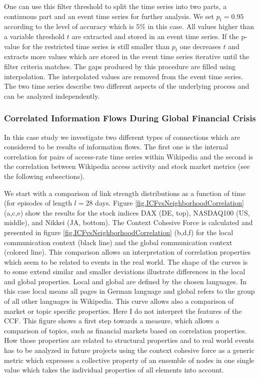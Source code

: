 \documentclass[a4paper,10pt]{scrbook}
\begin{document}
One can use this filter threshold to split the time series into two parts, a continuous part and an event time series for further analysis. We set $p_t = 0.95$ according to the level of accuracy which is $5\%$ in this case. All values higher than a variable threshold $t$ are extracted and stored in an event time series. If the p-value for the restricted time series is still smaller than $p_t$ one decreases $t$ and extracts more values which are stored in the event time series iterative until the filter criteria matches. The gaps produced by this procedure are filled using interpolation. The interpolated values are removed from the event time series. The two time series describe two different aspects of the underlying process and can be analyzed independently.

\subsubsection{Correlated Information Flows During Global Financial Crisis}
In this case study we investigate two different types of connections which are considered to be results of information flows. The first one is the internal correlation for pairs of access-rate time series within Wikipedia and the second is the correlation between Wikipedia access activity and stock market metrics (see the following subsections). 
%
\label{ext.fig.ICFvsNeighborhoodCorrelation} 

%
We start with a comparison of link strength distributions as a function of time (for episodes of length $l=28$ days. Figure 
\ref{fig.ICFvsNeighborhoodCorrelation} (a,c,e) show the results for the stock indices DAX (DE, top), NASDAQ100 (US, middle), and Nikkei (JA, bottom). The Context Cohesive Force is calculated and presented in figure \ref{fig.ICFvsNeighborhoodCorrelation} (b,d,f) for the local communication context (black line) and the global communication context (colored line). This comparison allows an interpretation of correlation properties which seem to be related to events in the real world. The shape of the curves is to some extend similar and smaller deviations illustrate differences in the local and global properties. Local and global are defined by the chosen languages. In this case local means all pages in German language and global refers to the group of all other languages in Wikipedia. This curve allows also a comparison of market or topic specific properties. Here I do not interpret the features of the CCF. This figure shows a first step towards a measure, which allows a comparison of topics, such as financial markets based on correlation properties. How those properties are related to structural properties and to real world events has to be analyzed in future projects using the context cohesive force as a generic metric which expresses a collective property of an ensemble of nodes in one single value which takes the individual properties of all elements into account.
\end{document}

